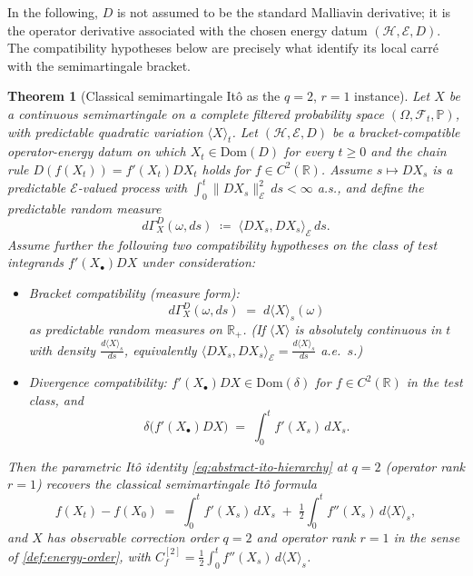 \documentclass[11pt,reqno]{amsart}
\theoremstyle{plain}
\newtheorem{theorem}{Theorem}[section]
\theoremstyle{definition}
\theoremstyle{remark}
\newcommand{\R}{\mathbb{R}}
\newcommand{\Prob}{\mathbb{P}}
\newcommand{\Hilb}{\mathcal{H}}
\newcommand{\Dom}{\mathrm{Dom}}
\newcommand{\Energy}{\mathcal{E}}
\newcommand{\Carre}{\Gamma}
\begin{document}
In the following, $D$ is not assumed to be the standard Malliavin
derivative; it is the operator derivative associated with the chosen
energy datum $(\Hilb,\Energy,D)$. The compatibility hypotheses below
are precisely what identify its local carr\'e with the semimartingale
bracket.

\begin{theorem}[Classical semimartingale It\^o as the $q=2$, $r=1$
instance]\label{thm:k2-recovery}
Let $X$ be a continuous semimartingale on a complete filtered
probability space $(\Omega,\mathcal F_t,\Prob)$, with predictable
quadratic variation $\langle X\rangle_t$. Let $(\Hilb,\Energy,D)$ be a
bracket-compatible operator-energy datum on which $X_t\in\Dom(D)$ for
every $t\ge 0$ and the chain rule $D(f(X_t))=f'(X_t)DX_t$ holds for
$f\in C^{2}(\R)$. Assume $s\mapsto DX_s$ is a predictable
$\Energy$-valued process with
$\int_{0}^{t}\|DX_s\|_{\Energy}^{2}\,ds<\infty$ a.s., and define
the predictable random measure
\[
  d\Carre^{D}_{X}(\omega,ds)\;\coloneqq\;\langle DX_s,DX_s\rangle_{\Energy}\,ds.
\]
Assume further the following two compatibility hypotheses on the
class of test integrands $f'(X_\bullet)DX$ under consideration:
\begin{itemize}
\item[(B)] \emph{Bracket compatibility (measure form):}
  \begin{equation}\label{eq:bracket-compat}
    d\Carre^{D}_{X}(\omega,ds) \;=\; d\langle X\rangle_s(\omega)
  \end{equation}
  as predictable random measures on $\R_{+}$. (If $\langle X\rangle$
  is absolutely continuous in $t$ with density
  $\tfrac{d\langle X\rangle_s}{ds}$, equivalently
  $\langle DX_s,DX_s\rangle_{\Energy}=\tfrac{d\langle X\rangle_s}{ds}$
  a.e.~$s$.)
\item[(D)] \emph{Divergence compatibility:} $f'(X_\bullet)DX
  \in\Dom(\delta)$ for $f\in C^{2}(\R)$ in the test class, and
  \begin{equation}\label{eq:div-compat}
    \delta\bigl(f'(X_\bullet)DX\bigr)
     \;=\;\int_0^t f'(X_s)\,dX_s.
  \end{equation}
\end{itemize}
Then the parametric It\^o identity \eqref{eq:abstract-ito-hierarchy}
at $q=2$ (operator rank $r=1$) recovers the classical semimartingale
It\^o formula
\begin{equation*}
  f(X_t)-f(X_0) \;=\; \int_0^t f'(X_s)\,dX_s
   \;+\;\tfrac12\!\int_0^t f''(X_s)\,d\langle X\rangle_s,
\end{equation*}
and $X$ has observable correction order $q=2$ and operator rank $r=1$
in the sense of \cref{def:energy-order}, with
$C_f^{[2]}=\tfrac12\int_0^t f''(X_s)\,d\langle X\rangle_s$.
\end{theorem}
\end{document}
